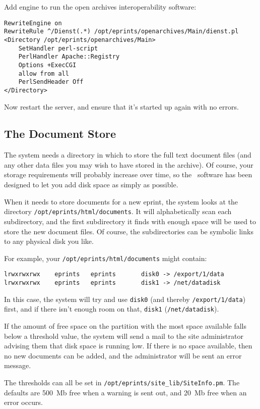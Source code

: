 {Add engine to run the open archives interoperability software:

\begin{verbatim}
RewriteEngine on
RewriteRule ^/Dienst(.*) /opt/eprints/openarchives/Main/dienst.pl
<Directory /opt/eprints/openarchives/Main>
    SetHandler perl-script
    PerlHandler Apache::Registry
    Options +ExecCGI
    allow from all
    PerlSendHeader Off
</Directory>
\end{verbatim}

Now restart the server, and ensure that it's started up again with no errors.


\subsection{The Document Store}

The system needs a directory in which to store the full text document files (and any other data files you may wish to have stored in the archive). Of course, your storage requirements will probably increase over time, so the \eprints\ software has been designed to let you add disk space as simply as possible.

When it needs to store documents for a new eprint, the system looks at the directory {\tt /opt/eprints/html/documents}. It will alphabetically scan each subdirectory, and the first subdirectory it finds with enough space will be used to store the new document files. Of course, the subdirectories can be symbolic links to any physical disk you like.

For example, your {\tt /opt/eprints/html/documents} might contain:

\begin{verbatim}
lrwxrwxrwx    eprints   eprints       disk0 -> /export/1/data
lrwxrwxrwx    eprints   eprints       disk1 -> /net/datadisk
\end{verbatim}

In this case, the system will try and use {\tt disk0} (and thereby {\tt /export/1/data}) first, and if there isn't enough room on that, {\tt disk1} ({\tt /net/datadisk}).

If the amount of free space on the partition with the most space available falls below a threshold value, the system will send a mail to the site administrator advising them that disk space is running low. If there is no space available, then no new documents can be added, and the administrator will be sent an error message.

The thresholds can all be set in {\tt /opt/eprints/site\_lib/SiteInfo.pm}. The defaults are 500~Mb free when a warning is sent out, and 20~Mb free when an error occurs.

}
